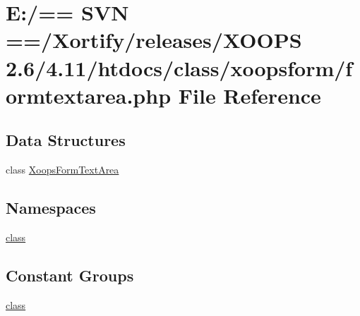 \hypertarget{formtextarea_8php}{\section{E\-:/== S\-V\-N ==/\-Xortify/releases/\-X\-O\-O\-P\-S 2.6/4.11/htdocs/class/xoopsform/formtextarea.php File Reference}
\label{formtextarea_8php}
}
\subsection*{Data Structures}
\begin{DoxyCompactItemize}
\item 
class \hyperlink{class_xoops_form_text_area}{Xoops\-Form\-Text\-Area}
\end{DoxyCompactItemize}
\subsection*{Namespaces}
\begin{DoxyCompactItemize}
\item 
\hyperlink{namespaceclass}{class}
\end{DoxyCompactItemize}
\subsection*{Constant Groups}
\begin{DoxyCompactItemize}
\item 
\hyperlink{namespaceclass}{class}
\end{DoxyCompactItemize}
